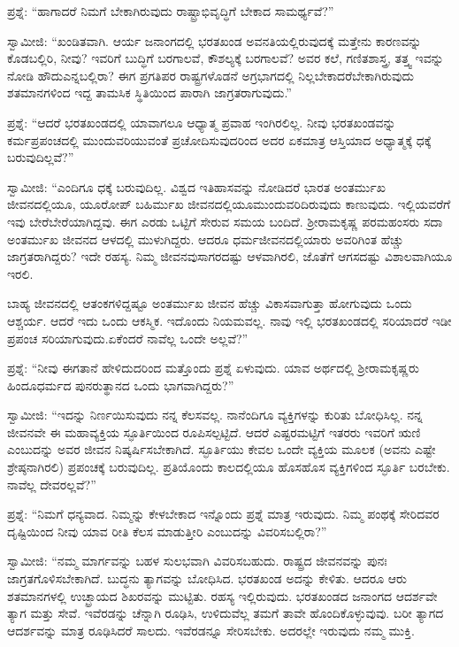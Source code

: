 ಪ್ರಶ್ನೆ: “ಹಾಗಾದರೆ ನಿಮಗೆ ಬೇಕಾಗಿರುವುದು ರಾಷ್ಟ್ರಾಭಿವೃದ್ಧಿಗೆ ಬೇಕಾದ ಸಾಮ\-ರ್ಥ್ಯವೆ?”

ಸ್ವಾಮೀಜಿ: “ಖಂಡಿತವಾಗಿ. ಆರ್ಯ ಜನಾಂಗದಲ್ಲಿ ಭರತಖಂಡ ಅವನತಿಯಲ್ಲಿರು\-ವುದಕ್ಕೆ ಮತ್ತೇನು ಕಾರಣವನ್ನು ಕೊಡಬಲ್ಲಿರಿ, ನೀವು? ಇವರಿಗೆ ಬುದ್ಧಿಗೆ ಬರಗಾಲವೆ, ಕೌಶಲ್ಯಕ್ಕೆ ಬರಗಾಲವೆ? ಅವರ ಕಲೆ, ಗಣಿತಶಾಸ್ತ್ರ, ತತ್ತ್ವ ಇವನ್ನು ನೋಡಿ ಹೌದು\break ಎನ್ನಬಲ್ಲಿರಾ? ಈಗ ಪ್ರಗತಿಪರ ರಾಷ್ಟ್ರಗಳೊಡನೆ ಅಗ್ರಭಾಗದಲ್ಲಿ ನಿಲ್ಲಬೇಕಾದರೆ\break ಬೇಕಾಗಿರುವುದು ಶತಮಾನಗಳಿಂದ ಇದ್ದ ತಾಮಸಿಕ ಸ್ಥಿತಿಯಿಂದ ಪಾರಾಗಿ ಜಾಗ್ರತರಾಗುವುದು.”

ಪ್ರಶ್ನೆ: “ಆದರೆ ಭರತಖಂಡದಲ್ಲಿ ಯಾವಾಗಲೂ ಆಧ್ಯಾತ್ಮ ಪ್ರವಾಹ ಇಂಗಿರಲಿಲ್ಲ. ನೀವು ಭರತಖಂಡವನ್ನು ಕರ್ಮಪ್ರಪಂಚದಲ್ಲಿ ಮುಂದುವರಿಯುವಂತೆ ಪ್ರಚೋದಿಸುವುದರಿಂದ ಅದರ ಏಕಮಾತ್ರ ಆಸ್ತಿಯಾದ ಅಧ್ಯಾತ್ಮಕ್ಕೆ ಧಕ್ಕೆ ಬರುವುದಿಲ್ಲವೆ?”

ಸ್ವಾಮೀಜಿ: “ಎಂದಿಗೂ ಧಕ್ಕೆ ಬರುವುದಿಲ್ಲ. ವಿಶ್ವದ ಇತಿಹಾಸವನ್ನು ನೋಡಿದರೆ ಭಾರತ ಅಂತರ್ಮುಖ ಜೀವನದಲ್ಲಿಯೂ, ಯೂರೋಪ್​ ಬಹಿರ್ಮುಖ ಜೀವನದಲ್ಲಿಯೂ\break ಮುಂದುವರಿದಿರುವುದು ಕಾಣುವುದು. ಇಲ್ಲಿಯವರೆಗೆ ಇವು ಬೇರೆಬೇರೆಯಾಗಿದ್ದವು. ಈಗ ಎರಡು ಒಟ್ಟಿಗೆ ಸೇರುವ ಸಮಯ ಬಂದಿದೆ. ಶ‍್ರೀರಾಮಕೃಷ್ಣ ಪರಮಹಂಸರು ಸದಾ ಅಂತರ್ಮುಖ ಜೀವನದ ಆಳದಲ್ಲಿ ಮುಳುಗಿದ್ದರು. ಆದರೂ ಧರ್ಮಜೀವನದಲ್ಲಿ\break ಯಾರು ಅವರಿಗಿಂತ ಹೆಚ್ಚು ಜಾಗ್ರತರಾಗಿದ್ದರು? ಇದೇ ರಹಸ್ಯ. ನಿಮ್ಮ ಜೀವನವು\break ಸಾಗರದಷ್ಟು ಆಳವಾಗಿರಲಿ, ಜೊತೆಗೆ ಆಗಸದಷ್ಟು ವಿಶಾಲವಾಗಿಯೂ ಇರಲಿ.

ಬಾಹ್ಯ ಜೀವನದಲ್ಲಿ ಆತಂಕಗಳಿದ್ದಷ್ಟೂ ಅಂತರ್ಮುಖ ಜೀವನ ಹೆಚ್ಚು ವಿಕಾಸವಾಗುತ್ತಾ ಹೋಗುವುದು ಒಂದು ಆಶ್ಚರ್ಯ. ಆದರೆ ಇದು ಒಂದು ಆಕಸ್ಮಿಕ. ಇದೊಂದು ನಿಯಮವಲ್ಲ. ನಾವು ಇಲ್ಲಿ ಭರತಖಂಡದಲ್ಲಿ ಸರಿಯಾದರೆ ಇಡೀ ಪ್ರಪಂಚ ಸರಿಯಾಗುವುದು.\break ಏಕೆಂದರೆ ನಾವೆಲ್ಲ ಒಂದೇ ಅಲ್ಲವೆ?”

ಪ್ರಶ್ನೆ: “ನೀವು ಈಗತಾನೆ ಹೇಳಿದುದರಿಂದ ಮತ್ತೊಂದು ಪ್ರಶ್ನೆ ಏಳುವುದು. ಯಾವ ಅರ್ಥದಲ್ಲಿ ಶ‍್ರೀರಾಮಕೃಷ್ಣರು ಹಿಂದೂಧರ್ಮದ ಪುನರುತ್ಥಾನದ ಒಂದು ಭಾಗವಾಗಿದ್ದರು?”

ಸ್ವಾಮೀಜಿ: “ಇದನ್ನು ನಿರ್ಣಯಿಸುವುದು ನನ್ನ ಕೆಲಸವಲ್ಲ. ನಾನೆಂದಿಗೂ ವ್ಯಕ್ತಿಗಳನ್ನು ಕುರಿತು ಬೋಧಿಸಿಲ್ಲ. ನನ್ನ ಜೀವನವೇ ಈ ಮಹಾವ್ಯಕ್ತಿಯ ಸ್ಫೂರ್ತಿಯಿಂದ ರೂಪಿಸಲ್ಪಟ್ಟಿದೆ. ಆದರೆ ಎಷ್ಟರಮಟ್ಟಿಗೆ ಇತರರು ಇವರಿಗೆ ಋಣಿ ಎಂಬುದನ್ನು ಅವರ ಜೀವನ ನಿಷ್ಕರ್ಷಿಸಬೇಕಾಗಿದೆ. ಸ್ಫೂರ್ತಿಯು ಕೇವಲ ಒಂದೇ ವ್ಯಕ್ತಿಯ ಮೂಲಕ (ಅವನು ಎಷ್ಟೇ ಶ್ರೇಷ್ಠನಾಗಿರಲಿ) ಪ್ರಪಂಚಕ್ಕೆ ಬರುವುದಿಲ್ಲ. ಪ್ರತಿಯೊಂದು ಕಾಲದಲ್ಲಿಯೂ ಹೊಸಹೊಸ ವ್ಯಕ್ತಿಗಳಿಂದ ಸ್ಫೂರ್ತಿ ಬರಬೇಕು. ನಾವೆಲ್ಲ ದೇವರಲ್ಲವೆ?”

ಪ್ರಶ್ನೆ: “ನಿಮಗೆ ಧನ್ಯವಾದ. ನಿಮ್ಮನ್ನು ಕೇಳಬೇಕಾದ ಇನ್ನೊಂದು ಪ್ರಶ್ನೆ ಮಾತ್ರ ಇರುವುದು. ನಿಮ್ಮ ಪಂಥಕ್ಕೆ ಸೇರಿದವರ ದೃಷ್ಟಿಯಿಂದ ನೀವು ಯಾವ ರೀತಿ ಕೆಲಸ ಮಾಡುತ್ತೀರಿ ಎಂಬುದನ್ನು ವಿವರಿಸಬಲ್ಲಿರಾ?”

ಸ್ವಾಮೀಜಿ: “ನಮ್ಮ ಮಾರ್ಗವನ್ನು ಬಹಳ ಸುಲಭವಾಗಿ ವಿವರಿಸಬಹುದು. ರಾಷ್ಟ್ರದ ಜೀವನವನ್ನು ಪುನಃ ಜಾಗ್ರತಗೊಳಿಸಬೇಕಾಗಿದೆ. ಬುದ್ಧನು ತ್ಯಾಗವನ್ನು ಬೋಧಿಸಿದ. ಭರತಖಂಡ ಅದನ್ನು ಕೇಳಿತು. ಆದರೂ ಆರು ಶತಮಾನಗಳಲ್ಲಿ ಉಚ್ಛ್ರಾಯದ ಶಿಖರವನ್ನು ಮುಟ್ಟಿತು. ರಹಸ್ಯ ಇಲ್ಲಿರುವುದು. ಭರತಖಂಡದ ಜನಾಂಗದ ಆದರ್ಶವೇ ತ್ಯಾಗ ಮತ್ತು ಸೇವೆ. ಇವೆರಡನ್ನು ಚೆನ್ನಾಗಿ ರೂಢಿಸಿ, ಉಳಿದುವೆಲ್ಲ ತಮಗೆ ತಾವೇ ಹೊಂದಿಕೊಳ್ಳುವುವು. ಬರೀ ತ್ಯಾಗದ ಆದರ್ಶವನ್ನು ಮಾತ್ರ ರೂಢಿಸಿದರೆ ಸಾಲದು. ಇವೆರಡನ್ನೂ ಸೇರಿಸಬೇಕು. ಅದರಲ್ಲೇ ಇರುವುದು ನಮ್ಮ ಮುಕ್ತಿ.

\eject

